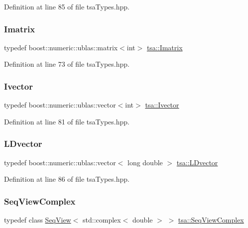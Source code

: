 Definition at line 85 of file tsa\+Types.\+hpp.

\mbox{\label{namespacetsa_aad3ff4a1af568c2cf9258474cecb868f}} 
\subsubsection{\texorpdfstring{Imatrix}{Imatrix}}
{\footnotesize\ttfamily typedef boost\+::numeric\+::ublas\+::matrix$<$int$>$ \hyperlink{namespacetsa_aad3ff4a1af568c2cf9258474cecb868f}{tsa\+::\+Imatrix}}



Definition at line 73 of file tsa\+Types.\+hpp.

\mbox{\label{namespacetsa_ac73258f98dd6a665991e1c9a71df691f}} 
\subsubsection{\texorpdfstring{Ivector}{Ivector}}
{\footnotesize\ttfamily typedef boost\+::numeric\+::ublas\+::vector$<$int$>$ \hyperlink{namespacetsa_ac73258f98dd6a665991e1c9a71df691f}{tsa\+::\+Ivector}}



Definition at line 81 of file tsa\+Types.\+hpp.

\mbox{\label{namespacetsa_ad1e65e148c1b8be13ee4da5b246b5adf}} 
\subsubsection{\texorpdfstring{L\+Dvector}{LDvector}}
{\footnotesize\ttfamily typedef boost\+::numeric\+::ublas\+::vector$<$ long double $>$ \hyperlink{namespacetsa_ad1e65e148c1b8be13ee4da5b246b5adf}{tsa\+::\+L\+Dvector}}



Definition at line 86 of file tsa\+Types.\+hpp.

\mbox{\label{namespacetsa_ab32775c889b53c40fa83939f22372b75}} 
\subsubsection{\texorpdfstring{Seq\+View\+Complex}{SeqViewComplex}}
{\footnotesize\ttfamily typedef class \hyperlink{classtsa_1_1_seq_view}{Seq\+View}$<$ std\+::complex$<$ double $>$ $>$ \hyperlink{namespacetsa_ab32775c889b53c40fa83939f22372b75}{tsa\+::\+Seq\+View\+Complex}}



